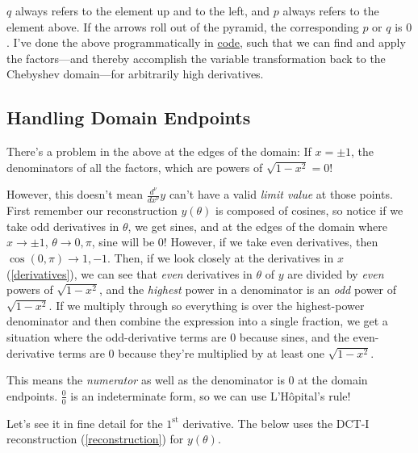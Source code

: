 \documentclass[10pt]{article}
\begin{document}
$q$ always refers to the element up and to the left, and $p$ always refers to the element above. If the arrows roll out of the pyramid, the corresponding $p$ or $q$ is $0$. I've done the above programmatically in \href{https://github.com/pavelkomarov/spectral-derivatives/blob/main/notebooks/alternative_chebyshev_derivative_methods.ipynb}{code}, such that we can find and apply the factors---and thereby accomplish the variable transformation back to the Chebyshev domain---for arbitrarily high derivatives.

\subsection{Handling Domain Endpoints}\label{endpoints}

There's a problem in the above at the edges of the domain: If $x = \pm 1$, the denominators of all the factors, which are powers of $\sqrt{1 - x^2} = 0$!

However, this doesn't mean $\frac{d^\nu}{dx^\nu} y$ can't have a valid \textit{limit value} at those points. First remember our reconstruction $y(\theta)$ is composed of cosines, so notice if we take odd derivatives in $\theta$, we get sines, and at the edges of the domain where $x \rightarrow \pm 1$, $\theta \rightarrow 0,\pi$, sine will be 0! However, if we take even derivatives, then $\cos(0,\pi) \rightarrow 1, -1$. Then, if we look closely at the derivatives in $x$ (\autoref{derivatives}), we can see that \textit{even} derivatives in $\theta$ of $y$ are divided by \textit{even} powers of $\sqrt{1 - x^2}$, and the \textit{highest} power in a denominator is an \textit{odd} power of $\sqrt{1 - x^2}$. If we multiply through so everything is over the highest-power denominator and then combine the expression into a single fraction, we get a situation where the odd-derivative terms are 0 because sines, and the even-derivative terms are 0 because they're multiplied by at least one $\sqrt{1 - x^2}$.

This means the \textit{numerator} as well as the denominator is $0$ at the domain endpoints. $\frac{0}{0}$ is an indeterminate form, so we can use L'Hôpital's rule!

Let's see it in fine detail for the $1^\text{st}$ derivative. The below uses the DCT-I reconstruction (\autoref{reconstruction}) for $y(\theta)$.
\end{document}
